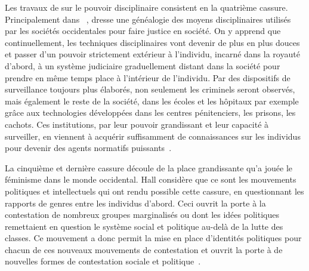 Les travaux de \citeauthor{Foucault2004a} sur le pouvoir disciplinaire consistent en la quatrième cassure. 
Principalement dans ~\citeyearpar{Foucault2004a}, \citeauthor{Foucault2004a} dresse une généalogie des moyens disciplinaires utilisés par les sociétés occidentales pour faire justice en société. 
On y apprend que continuellement, les techniques disciplinaires vont devenir de plus en plus douces et passer d'un pouvoir strictement extérieur à l'individu, incarné dans la royauté d'abord, à un système judiciaire graduellement distant dans la société pour prendre en même temps place à l'intérieur de l'individu. 
Par des dispositifs de surveillance toujours plus élaborés, non seulement les criminels seront observés, mais également le reste de la société, dans les écoles et les hôpitaux par exemple grâce aux technologies développées dans les centres pénitenciers, les prisons, les cachots. 
Ces institutions, par leur pouvoir grandissant et leur capacité à surveiller, en viennent à acquérir suffisamment de connaissances sur les individus pour devenir des agents normatifs puissants~\citep[608--609]{Hall1996a}.

La cinquième et dernière cassure découle de la place grandissante qu'a jouée le féminisme dans le monde occidental. 
Hall considère que ce sont les mouvements politiques et intellectuels qui ont rendu possible cette cassure, en questionnant les rapports de genres entre les individus d'abord. 
Ceci ouvrit la porte à la contestation de nombreux groupes marginalisés ou dont les idées politiques remettaient en question le système social et politique au-delà de la lutte des classes. 
Ce mouvement a donc permit la mise en place d'identités politiques pour chacun de ces nouveaux mouvements de contestation et ouvrit la porte à de nouvelles formes de contestation sociale et politique~\citeyearpar[610]{Hall1996a}.

